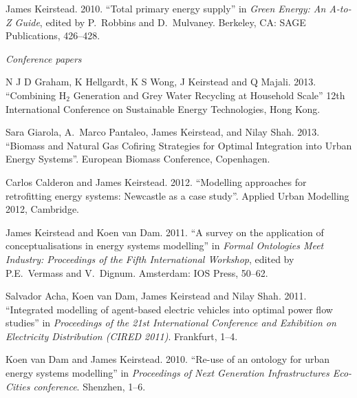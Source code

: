 \documentclass[11pt,a4paper]{article}
\begin{document}
\ind James Keirstead. 2010. ``Total primary energy supply'' in \emph{Green Energy: An A-to-Z Guide}, edited by P.\ Robbins and D.\ Mulvaney.  Berkeley, CA: SAGE Publications, 426--428.


\bigskip 

\noindent\emph{Conference papers \vspace{0.01in}}




\ind N J D Graham, K Hellgardt, K S Wong, J Keirstead and Q Majali. 2013. ``Combining H$_2$ Generation and Grey Water Recycling at Household Scale'' 12th International Conference on Sustainable Energy Technologies, Hong Kong.

\ind Sara Giarola, A.\ Marco Pantaleo, James Keirstead, and Nilay Shah. 2013. ``Biomass and Natural Gas Cofiring Strategies for Optimal Integration into Urban Energy Systems''.  European Biomass Conference, Copenhagen.

\ind Carlos Calderon and James Keirstead. 2012. ``Modelling approaches for retrofitting energy systems: Newcastle as a case study''.  Applied Urban Modelling 2012, Cambridge.

\ind James Keirstead and Koen van Dam. 2011. ``A survey on the application of conceptualisations in energy systems modelling'' in \emph{Formal Ontologies Meet Industry: Proceedings of the Fifth International Workshop}, edited by P.E.\ Vermass and V.\ Dignum.  Amsterdam: IOS Press, 50--62.

\ind Salvador Acha, Koen van Dam, James Keirstead and Nilay Shah. 2011. ``Integrated modelling of agent-based electric vehicles into optimal power flow studies'' in \emph{Proceedings of the 21st International Conference and Exhibition on Electricity Distribution (CIRED 2011)}.  Frankfurt, 1--4.

\ind Koen van Dam and James Keirstead. 2010. ``Re-use of an ontology for urban energy systems modelling'' in \emph{Proceedings of Next Generation Infrastructures Eco-Cities conference}.  Shenzhen, 1--6.
\end{document}
